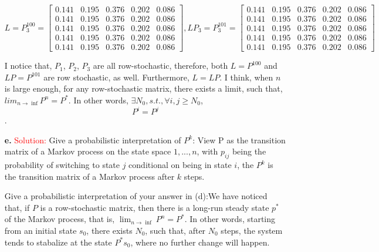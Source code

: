 \documentclass[11pt]{article} %
\begin{document}
\begin{itemize}
    $$
    L=P_3^100 = \begin{bmatrix}
      0.141  &  0.195  &  0.376  &  0.202  &  0.086 \\
      0.141  &  0.195  &  0.376  &  0.202  &  0.086 \\
      0.141  &  0.195  &  0.376  &  0.202  &  0.086 \\
      0.141  &  0.195  &  0.376  &  0.202  &  0.086 \\
      0.141  &  0.195  &  0.376  &  0.202  &  0.086
    \end{bmatrix},
   LP_3=P_3^101 = \begin{bmatrix}
      0.141  &  0.195  &  0.376  &  0.202  &  0.086 \\
      0.141  &  0.195  &  0.376  &  0.202  &  0.086 \\
      0.141  &  0.195  &  0.376  &  0.202  &  0.086 \\
      0.141  &  0.195  &  0.376  &  0.202  &  0.086 \\
      0.141  &  0.195  &  0.376  &  0.202  &  0.086
    \end{bmatrix} 
    $$


I notice that, $P_1$, $P_2$, $P_3$ are all row-stochastic, therefore, both $L=P^100$ and $LP=P^101$ are row stochastic, as well. Furthermore, $L=LP$. I think, when $n$ is large enough, for any row-stochastic matrix, there exists a limit, such that, $lim _{n\to \inf} P^n = P^{*}$. In other words,  $\exists N_0  , s.t. ,  \forall i,j \ge N_0 $, $$ P^i=P^j $$.



  \item[\textbf{e.}] 
\textcolor{red}{Solution:}
Give a probabilistic interpretation of $P^k$: View P as the transition matrix of a Markov process on the state space ${1,...,n}$, with $p_{ij}$ being the probability of switching to state $j$ conditional on being in state $i$, the $P^k$ is the transition matrix of a Markov process after $k$ steps. 

Give a probabilistic interpretation of your answer in (d):We have noticed that, if $P$ is a row-stochastic matrix, then there is a long-run steady state $p^{*}$ of the Markov process, that is, $\lim_{n \to \inf} P^n = P^{*}$. In other words, starting from an initial state $s_0$, there exists $N_0$, such that, after $N_0$ steps, the system tends to stabalize at the state  $P^{*} s_0$, where no further change will happen.
 
\end{itemize}
\end{document}
